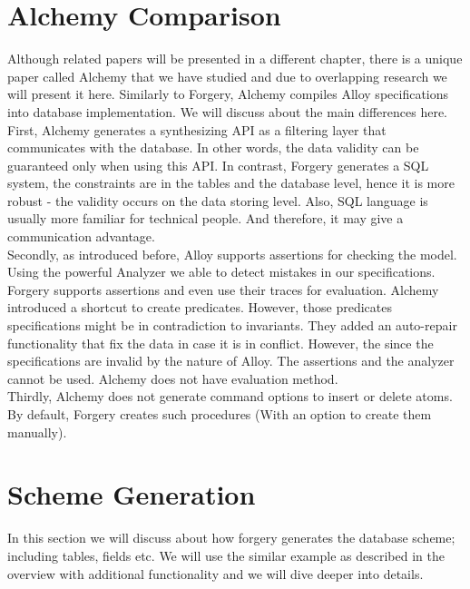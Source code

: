 \documentclass[oneside]{book}
\begin{document}
\section{Alchemy Comparison}
Although related papers will be presented in a different chapter, there is a unique paper called Alchemy \cite{alchemy} that we 
have studied and due to overlapping research we will present it here. Similarly to Forgery, Alchemy compiles Alloy specifications into database implementation. We will discuss about the main differences here.\\

First, Alchemy generates a synthesizing API as a filtering layer that communicates with the database. In other words, the data validity can be guaranteed only when using this API. In contrast, Forgery generates a SQL system, the constraints are in the tables and the database level, hence it is more robust - the validity occurs on the data storing level. Also, SQL language is usually more familiar for technical people. And therefore, it may give a communication advantage.\\

Secondly, as introduced before, Alloy supports assertions for checking the model. Using the powerful Analyzer we able to detect mistakes in our specifications. Forgery supports assertions and even use their traces for evaluation. Alchemy introduced a shortcut to create predicates. However, those predicates specifications might be in contradiction to invariants. They added an auto-repair functionality that fix the data in case it is in conflict. However, the since the specifications are invalid by the nature of Alloy. The assertions and the analyzer cannot be used. Alchemy does not have evaluation method.\\

Thirdly, Alchemy does not generate command options to insert or delete atoms. By default, Forgery creates such procedures (With an option to create them manually).

\newpage

\section{Scheme Generation}
\label{sec:schemegen}

In this section we will discuss about how forgery generates the database scheme; including tables, fields etc. We will use the similar example as described in the overview with additional functionality and we will dive deeper into details.\\
\end{document}
